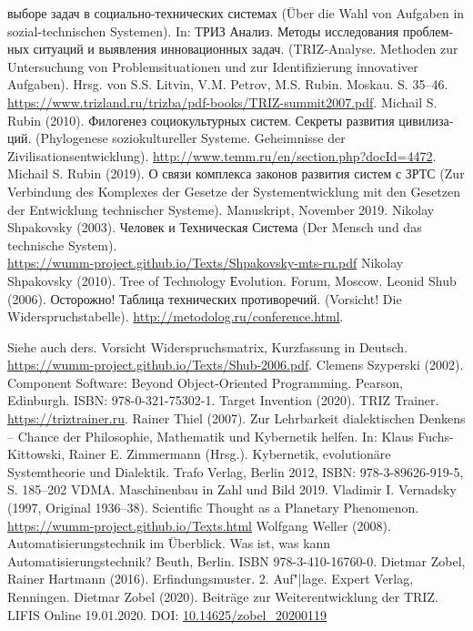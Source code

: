 \documentclass[12pt,a4paper]{article}
\begin{document}
\begin{thebibliography}{xxx}
{  выборе задач в социально-технических системах} (Über die Wahl von Aufgaben
  in sozial-technischen Systemen). In: \foreignlanguage{russian}{ТРИЗ Анализ.
    Методы исследования проблемных ситуаций и выявления инновационных задач}.
  (TRIZ-Analyse. Methoden zur Untersuchung von Problemsituationen und zur
  Identifizierung innovativer Aufgaben). Hrsg. von S.S. Litvin, V.M. Petrov,
  M.S. Rubin. Moskau. S. 35--46.\\
  \url{https://www.trizland.ru/trizba/pdf-books/TRIZ-summit2007.pdf}.
 Michail S. Rubin (2010).
  \foreignlanguage{russian}{Филогенез социокультурных систем. Секреты развития
    цивилизаций}.  (Phylogenese soziokultureller Systeme. Geheimnisse der
  Zivilisationsentwicklung).
  \url{http://www.temm.ru/en/section.php?docId=4472}.
 Michail S. Rubin (2019).  \foreignlanguage{russian}{О
  связи комплекса законов развития систем с ЗРТС} (Zur Verbindung des
  Komplexes der Gesetze der Systementwicklung mit den Gesetzen der Entwicklung
  technischer Systeme). Manuskript, November 2019.
 Nikolay Shpakovsky (2003).
  \foreignlanguage{russian}{Человек и Техническая Система} (Der Mensch und das
  technische System).\\
  \url{https://wumm-project.github.io/Texts/Shpakovsky-mts-ru.pdf}
 Nikolay Shpakovsky (2010).  Tree of Technology
  Еvolution. Forum, Moscow.
 Leonid Shub (2006). \foreignlanguage{russian}{Осторожно!
  Таблица технических противоречий}. (Vorsicht! Die Widerspruchstabelle).
  \url{http://metodolog.ru/conference.html}.

  Siehe auch ders. Vorsicht Widerspruchsmatrix, Kurzfassung in Deutsch.\\
  \url{https://wumm-project.github.io/Texts/Shub-2006.pdf}.
 Clemens Szyperski (2002). Component Software: Beyond
  Object-Oriented Programming. Pearson, Edinburgh. ISBN: 978-0-321-75302-1.
 Target Invention (2020). TRIZ Trainer.
  \url{https://triztrainer.ru}.
 Rainer Thiel (2007). Zur Lehrbarkeit dialektischen Denkens
  – Chance der Philosophie, Mathematik und Kybernetik helfen. In: Klaus
  Fuchs-Kittowski, Rainer E. Zimmermann (Hrsg.). Kybernetik, evolutionäre
  Systemtheorie und Dialektik. Trafo Verlag, Berlin 2012, ISBN:
  978-3-89626-919-5, S. 185--202
 VDMA. Maschinenbau in Zahl und Bild 2019. 
 Vladimir I. Vernadsky (1997, Original 1936--38).
  Scientific Thought as a Planetary Phenomenon.
  \url{https://wumm-project.github.io/Texts.html}
 Wolfgang Weller (2008). Automatisierungstechnik im
  Überblick. Was ist, was kann Automatisierungstechnik? Beuth, Berlin. ISBN
  978-3-410-16760-0.
 Dietmar Zobel, Rainer Hartmann (2016). Erfindungsmuster.
  2. Auf"|lage.  Expert Verlag, Renningen.
 Dietmar Zobel (2020). Beiträge zur Weiterentwicklung der
  TRIZ.\\  LIFIS Online 19.01.2020. DOI: \url{10.14625/zobel_20200119}
\end{thebibliography}

\end{document}
